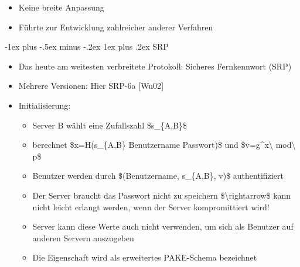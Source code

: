 \documentclass[a4paper]{article}
\makeatletter
\renewcommand{\subsubsection}{\@startsection{subsubsection}{3}{0mm}%
 {-1ex plus -.5ex minus -.2ex}%
 {1ex plus .2ex}%
 {\normalfont\small\bfseries}}
\makeatother
\begin{document}
\begin{multicols}{3}
\begin{itemize}
              \begin{itemize}
                  \item
                        Keine breite Anpassung
                  \item
                        Führte zur Entwicklung zahlreicher anderer Verfahren
              \end{itemize}
    \end{itemize}


    \subsubsection{SRP}

    \begin{itemize}
        \item
              Das heute am weitesten verbreitete Protokoll: Sicheres Fernkennwort
              (SRP)
        \item
              Mehrere Versionen: Hier SRP-6a {[}Wu02{]}
        \item
              Initialisierung:

              \begin{itemize}
                  \item
                        Server B wählt eine Zufallszahl \$s\_\{A,B\}\$
                  \item
                        berechnet \$x=H(s\_\{A,B\} \textbar\textbar{} Benutzername
                        \textbar\textbar{} Passwort)\$ und \$v=g\^{}x\textbackslash{}
                        mod\textbackslash{} p\$
                  \item
                        Benutzer werden durch \$(Benutzername, s\_\{A,B\}, v)\$
                        authentifiziert
                  \item
                        Der Server braucht das Passwort nicht zu speichern
                        \$\textbackslash rightarrow\$ kann nicht leicht erlangt werden, wenn
                        der Server kompromittiert wird!
                  \item
                        Server kann diese Werte auch nicht verwenden, um sich als Benutzer
                        auf anderen Servern auszugeben
                  \item
                        Die Eigenschaft wird als erweitertes PAKE-Schema bezeichnet
              \end{itemize}
    \end{itemize}



\end{multicols}
\end{document}
